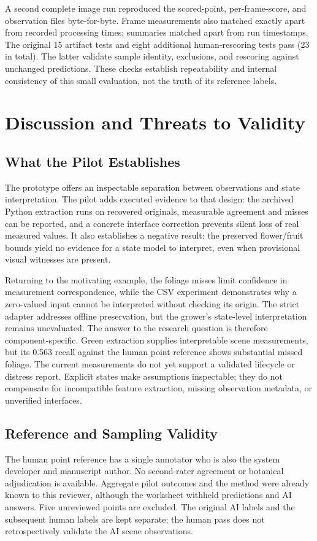 \documentclass[runningheads]{llncs}
\begin{document}
A second complete image run reproduced the scored-point, per-frame-score, and observation files byte-for-byte. Frame measurements also matched exactly apart from recorded processing times; summaries matched apart from run timestamps. The original 15 artifact tests and eight additional human-rescoring tests pass (23 in total). The latter validate sample identity, exclusions, and rescoring against unchanged predictions. These checks establish repeatability and internal consistency of this small evaluation, not the truth of its reference labels.

\section{Discussion and Threats to Validity}
\label{sec:discussion}
\subsection{What the Pilot Establishes}
The prototype offers an inspectable separation between observations and state interpretation. The pilot adds executed evidence to that design: the archived Python extraction runs on recovered originals, measurable agreement and misses can be reported, and a concrete interface correction prevents silent loss of real measured values. It also establishes a negative result: the preserved flower/fruit bounds yield no evidence for a state model to interpret, even when provisional visual witnesses are present.

Returning to the motivating example, the foliage misses limit confidence in measurement correspondence, while the CSV experiment demonstrates why a zero-valued input cannot be interpreted without checking its origin. The strict adapter addresses offline preservation, but the grower's state-level interpretation remains unevaluated. The answer to the research question is therefore component-specific. Green extraction supplies interpretable scene measurements, but its 0.563 recall against the human point reference shows substantial missed foliage. The current measurements do not yet support a validated lifecycle or distress report. Explicit states make assumptions inspectable; they do not compensate for incompatible feature extraction, missing observation metadata, or unverified interfaces.

\subsection{Reference and Sampling Validity}
The human point reference has a single annotator who is also the system developer and manuscript author. No second-rater agreement or botanical adjudication is available. Aggregate pilot outcomes and the method were already known to this reviewer, although the worksheet withheld predictions and AI answers. Five unreviewed points are excluded. The original AI labels and the subsequent human labels are kept separate; the human pass does not retrospectively validate the AI scene observations.
\end{document}
